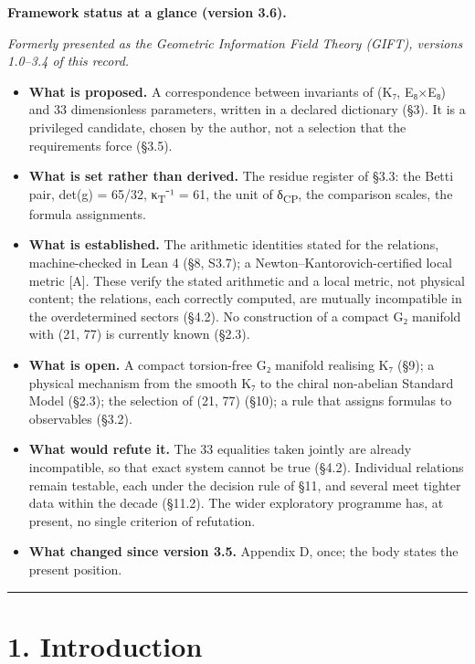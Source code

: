 \documentclass[11pt,a4paper]{article}
\begin{document}
\textbf{Framework status at a glance (version 3.6).}

\emph{Formerly presented as the Geometric Information Field Theory (GIFT), versions 1.0--3.4 of this record.}

\begin{itemize}
\tightlist
\item
  \textbf{What is proposed.} A correspondence between invariants of (K₇, E₈×E₈) and 33 dimensionless parameters, written in a declared dictionary (§3). It is a privileged candidate, chosen by the author, not a selection that the requirements force (§3.5).
\item
  \textbf{What is set rather than derived.} The residue register of §3.3: the Betti pair, det(g) = 65/32, κ\textsubscript{T}⁻¹ = 61, the unit of δ\textsubscript{CP}, the comparison scales, the formula assignments.
\item
  \textbf{What is established.} The arithmetic identities stated for the relations, machine-checked in Lean 4 (§8, S3.7); a Newton--Kantorovich-certified local metric {[}A{]}. These verify the stated arithmetic and a local metric, not physical content; the relations, each correctly computed, are mutually incompatible in the overdetermined sectors (§4.2). No construction of a compact G₂ manifold with (21, 77) is currently known (§2.3).
\item
  \textbf{What is open.} A compact torsion-free G₂ manifold realising K₇ (§9); a physical mechanism from the smooth K₇ to the chiral non-abelian Standard Model (§2.3); the selection of (21, 77) (§10); a rule that assigns formulas to observables (§3.2).
\item
  \textbf{What would refute it.} The 33 equalities taken jointly are already incompatible, so that exact system cannot be true (§4.2). Individual relations remain testable, each under the decision rule of §11, and several meet tighter data within the decade (§11.2). The wider exploratory programme has, at present, no single criterion of refutation.
\item
  \textbf{What changed since version 3.5.} Appendix D, once; the body states the present position.
\end{itemize}

\begin{center}\rule{\linewidth}{0.5pt}\end{center}

\section{1. Introduction}\label{introduction}
\end{document}
